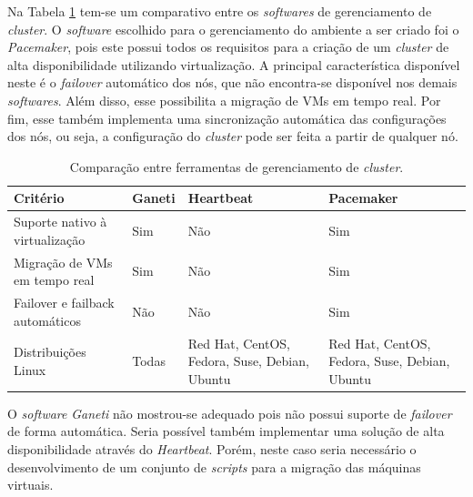 Na Tabela \ref{tab:clusterger} tem-se um comparativo entre os \textit{softwares} de gerenciamento de \textit{cluster}. O \textit{software} 
escolhido para o gerenciamento do ambiente a ser criado foi o \textit{Pacemaker}, pois este possui todos os requisitos para a criação de um 
\textit{cluster} de alta disponibilidade utilizando virtualização. A principal característica disponível neste é o \textit{failover} automático
dos nós, que não encontra-se disponível nos demais \textit{softwares}. Além disso, esse possibilita a migração de \acp{VM} em tempo real. 
Por fim, esse também implementa uma sincronização automática das configurações dos nós, ou seja, a configuração do \textit{cluster} pode ser 
feita a partir de qualquer nó. 

\begin{table}[h!]
\caption{Comparação entre ferramentas de gerenciamento de \textit{cluster}.}
\label{tab:clusterger}
\begin{center}
\begin{tabular}{|l|p{2cm}|p{3.5cm}|p{3.5cm}|}\hline
\textbf{Critério} & \textbf{Ganeti} & \textbf{Heartbeat} & \textbf{Pacemaker} \\\hline
Suporte nativo à virtualização & Sim & Não & Sim \\\hline
Migração de \acp{VM} em tempo real & Sim & Não & Sim \\\hline
Failover e failback automáticos & Não & Não & Sim \\\hline
Distribuições Linux & Todas & Red Hat, CentOS, Fedora, Suse, Debian, Ubuntu & Red Hat, CentOS, Fedora, Suse, Debian, Ubuntu \\\hline
\end{tabular}
\end{center}
\end{table}

O \textit{software} \textit{Ganeti} não mostrou-se adequado pois não possui suporte de \textit{failover} de forma automática. 
Seria possível também implementar uma solução de alta disponibilidade através do \textit{Heartbeat}. Porém, neste caso seria necessário 
o desenvolvimento de um conjunto de \textit{scripts} para a migração das máquinas virtuais.

